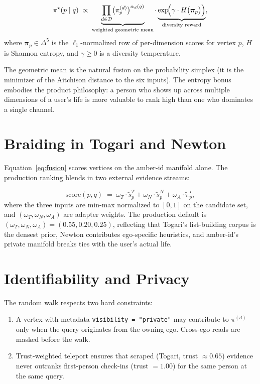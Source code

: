 \documentclass[11pt]{article}
\begin{document}
\begin{equation}
\label{eq:fusion}
\pi^\star(p \mid q)
 \;\propto\;
 \underbrace{\prod_{d\in\mathcal{D}} \bigl(\pi^{(d)}_p\bigr)^{\alpha_d(q)}}_{\text{weighted geometric mean}}
 \cdot
 \underbrace{\exp\!\Bigl(\gamma \cdot H\bigl(\bm{\pi}_p\bigr)\Bigr)}_{\text{diversity reward}},
\end{equation}
where $\bm{\pi}_p \in \Delta^5$ is the $\ell_1$-normalized row of
per-dimension scores for vertex $p$, $H$ is Shannon entropy, and
$\gamma \ge 0$ is a diversity temperature.

The geometric mean is the natural fusion on the probability simplex
(it is the minimizer of the Aitchison distance to the six inputs).
The entropy bonus embodies the product philosophy: a person who shows
up across multiple dimensions of a user's life is more valuable to
rank high than one who dominates a single channel.

\section{Braiding in Togari and Newton}

Equation~\ref{eq:fusion} scores vertices on the amber-id manifold
alone. The production ranking blends in two external evidence streams:

\begin{equation}
\label{eq:braid}
\text{score}(p, q)
 \;=\;
 \omega_T \cdot \tilde s^T_p
 + \omega_N \cdot \tilde s^N_p
 + \omega_A \cdot \tilde\pi^\star_p,
\end{equation}
where the three inputs are min-max normalized to $[0,1]$ on the
candidate set, and $(\omega_T, \omega_N, \omega_A)$ are adapter
weights. The production default is
$(\omega_T, \omega_N, \omega_A) = (0.55, 0.20, 0.25)$,
reflecting that Togari's list-building corpus is the densest prior,
Newton contributes ego-specific heuristics, and amber-id's private
manifold breaks ties with the user's actual life.

\section{Identifiability and Privacy}

The random walk respects two hard constraints:

\begin{enumerate}
\item A vertex with metadata \texttt{visibility = "private"} may
      contribute to $\pi^{(d)}$ only when the query originates from
      the owning ego. Cross-ego reads are masked before the walk.
\item Trust-weighted teleport ensures that scraped (Togari, trust
      $\approx 0.65$) evidence never outranks first-person check-ins
      (trust $= 1.00$) for the same person at the same query.
\end{enumerate}
\end{document}
